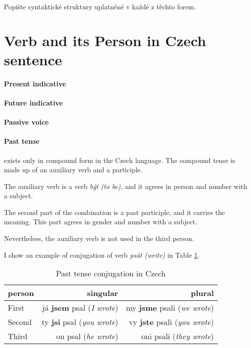 Popište syntaktické struktury uplatněné v každé z těchto forem.

\section{Verb and its Person in Czech sentence}

\paragraph{Present indicative}

\paragraph{Future indicative}

\paragraph{Passive voice}

\paragraph{Past tense} exists only in compound form in the Czech language. The compound tense is made up of an auxiliary verb and a participle.

The auxiliary verb is a verb \emph{být (to be)}, and it agrees in person and number with a subject.

The second part of the combination is a past participle, and it carries the meaning. This part agrees in gender and number with a subject.

Nevertheless, the auxiliary verb is not used in the third person.

I show an example of conjugation of verb \emph{psát (write)} in Table \ref{tab:past-tense-conj}.

\begin{table}[!ht]
	\caption{Past tense conjugation in Czech}
	\label{tab:past-tense-conj}
	\begin{center}
		\begin{tabular}{l|r|r}
			person & singular & plural \\
			\hline
			First & já \textbf{jsem} psal (\emph{I wrote}) & my \textbf{jsme} psali (\emph{we wrote}) \\
			Second & ty \textbf{jsi} psal (\emph{you wrote}) & vy \textbf{jste} psali (\emph{you wrote})  \\
			Third & on psal (\emph{he wrote}) & oni psali (\emph{they wrote})  \\
		\end{tabular}
	\end{center}
\end{table}

